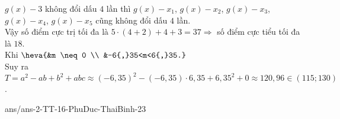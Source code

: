\begin{ex}
{\begin{center}
\begin{tikzpicture}
\end{tikzpicture}
\end{center}
$g(x)-3$ không đổi dấu $4$ lần thì $g(x)-x_{1}$, $g(x)-x_{2}$, $g(x)-x_{3}$, $g(x)-x_{4}$, $g(x)-x_{5}$ cũng không đổi dấu $4$ lần.\\
Vậy số điểm cực trị tối đa là $5 \cdot(4+2)+4+3=37 \Rightarrow$ số điểm cực tiểu tối đa là $18 $. \\
Khi $\heva{&m \neq 0 \\ &-6{,}35<m<6{,}35.}$\\
Suy ra $ T=a^{2}-a b+b^{2}+a b c \approx(-6,35)^{2}-(-6,35) \cdot 6{,}35+6{,}35^{2}+0 \approx 120{,}96 \in(115 ; 130)$.
}
\end{ex}


\begin{indapan}{10}
	{ans/ans-2-TT-16-PhuDuc-ThaiBinh-23}
\end{indapan}

